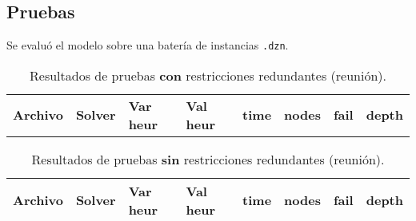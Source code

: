 
\subsection{Pruebas}\label{sec:05-reunion-pruebas}
Se evaluó el modelo sobre una batería de instancias \texttt{.dzn}.

\begin{compactfloats}
  \begin{table}[H]
    \centering
    \small
    \setlength{\tabcolsep}{2.8pt}
    \caption{Resultados de pruebas \textbf{con} restricciones redundantes (reunión).}
    \label{tab:pruebas-reunion-on}
    \begin{tabular}{l l l l r r r r}
      \toprule
      \textbf{Archivo} & \textbf{Solver} & \textbf{Var heur} & \textbf{Val heur} & \textbf{time} & \textbf{nodes} & \textbf{fail} & \textbf{depth} \\
    \end{tabular}
  \end{table}
  
  \begin{table}[H]
    \centering
    \small
    \setlength{\tabcolsep}{2.8pt}
    \caption{Resultados de pruebas \textbf{sin} restricciones redundantes (reunión).}
    \label{tab:pruebas-reunion-off}
    \begin{tabular}{l l l l r r r r}
      \toprule
      \textbf{Archivo} & \textbf{Solver} & \textbf{Var heur} & \textbf{Val heur} & \textbf{time} & \textbf{nodes} & \textbf{fail} & \textbf{depth} \\
      \bottomrule
    \end{tabular}
  \end{table}
\end{compactfloats}

\FloatBarrier
